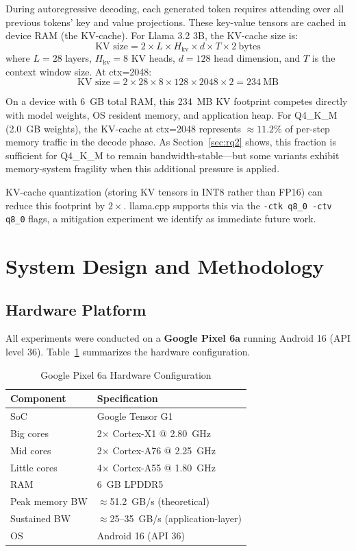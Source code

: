 \documentclass[conference]{IEEEtran}
\begin{document}
During autoregressive decoding, each generated token requires attending over
all previous tokens' key and value projections. These key-value tensors are
cached in device RAM (the KV-cache). For Llama 3.2 3B, the KV-cache size is:
\[
  \text{KV size} = 2 \times L \times H_{\text{kv}} \times d \times T \times 2~\text{bytes}
\]
where $L{=}28$ layers, $H_{\text{kv}}{=}8$ KV heads, $d{=}128$ head dimension,
and $T$ is the context window size. At ctx=2048:
\[
  \text{KV size} = 2 \times 28 \times 8 \times 128 \times 2048 \times 2 = 234~\text{MB}
\]

On a device with 6~GB total RAM, this 234~MB KV footprint competes directly
with model weights, OS resident memory, and application heap. For Q4\_K\_M
(2.0~GB weights), the KV-cache at ctx=2048 represents ${\approx}11.2\%$ of
per-step memory traffic in the decode phase. As Section~\ref{sec:rq2} shows,
this fraction is sufficient for Q4\_K\_M to remain bandwidth-stable---but
some variants exhibit memory-system fragility when this additional pressure is
applied.

KV-cache quantization (storing KV tensors in INT8 rather than FP16) can reduce
this footprint by $2\times$. llama.cpp supports this via the
\texttt{-ctk q8\_0 -ctv q8\_0} flags, a mitigation experiment we identify as
immediate future work.

\section{System Design and Methodology}
\label{sec:methodology}

\subsection{Hardware Platform}

All experiments were conducted on a \textbf{Google Pixel 6a} running Android 16
(API level 36). Table~\ref{tab:hardware} summarizes the hardware configuration.

\begin{table}[h]
\centering
\caption{Google Pixel 6a Hardware Configuration}
\label{tab:hardware}
\begin{tabular}{ll}
\toprule
\textbf{Component} & \textbf{Specification} \\
\midrule
SoC & Google Tensor G1 \\
Big cores & 2$\times$ Cortex-X1 @ 2.80~GHz \\
Mid cores & 2$\times$ Cortex-A76 @ 2.25~GHz \\
Little cores & 4$\times$ Cortex-A55 @ 1.80~GHz \\
RAM & 6~GB LPDDR5 \\
Peak memory BW & ${\approx}$51.2~GB/s (theoretical) \\
Sustained BW & ${\approx}$25--35~GB/s (application-layer) \\
OS & Android 16 (API 36) \\
\bottomrule
\end{tabular}
\end{table}
\end{document}
